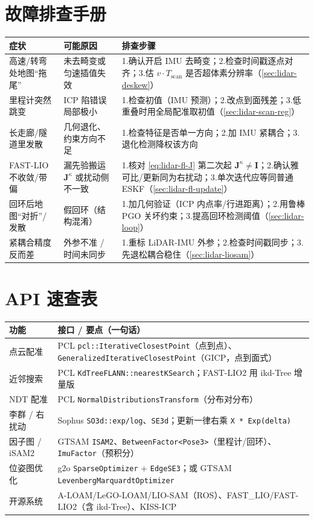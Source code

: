 \section*{故障排查手册}
\begin{table}[H]\centering\small
\begin{tabular}{p{} p{} p{}}
\toprule
症状 & 可能原因 & 排查步骤 \\
\midrule
高速/转弯处地图“拖尾” & 未去畸变或匀速插值失效 & 1.确认开启 IMU 去畸变；2.检查时间戳逐点对齐；3.估 $v\cdot T_{\text{scan}}$ 是否超体素分辨率（\cref{sec:lidar-deskew}）\\
里程计突然跳变 & ICP 陷错误局部极小 & 1.检查初值（IMU 预测）；2.改点到面残差；3.低重叠时用全局配准取初值（\cref{sec:lidar-scan-reg}）\\
长走廊/隧道里发散 & 几何退化、约束方向不足 & 1.检查特征是否单一方向；2.加 IMU 紧耦合；3.退化检测降权该方向 \\
FAST-LIO 不收敛/带偏 & 漏先验搬运 $\mathbf{J}^\kappa$ 或扰动侧不一致 & 1.核对 \cref{eq:lidar-fl-J} 第二次起 $\mathbf{J}^\kappa\neq\mathbf{I}$；2.确认雅可比/更新同为右扰动；3.单次迭代应等同普通 ESKF（\cref{sec:lidar-fl-update}）\\
回环后地图“对折”/发散 & 假回环（结构混淆） & 1.加几何验证（ICP 内点率/行进距离）；2.用鲁棒 PGO 关坏约束；3.提高回环检测阈值（\cref{sec:lidar-loop}）\\
紧耦合精度反而差 & 外参不准 / 时间未同步 & 1.重标 LiDAR-IMU 外参；2.检查时间戳同步；3.先退松耦合稳住（\cref{sec:lidar-liosam}）\\
\bottomrule
\end{tabular}
\end{table}

\section*{API 速查表}
\begin{table}[H]\centering\small
\begin{tabular}{p{} p{}}
\toprule
功能 & 接口 / 要点（一句话） \\
\midrule
点云配准 & PCL \texttt{pcl::IterativeClosestPoint}（点到点）、\texttt{GeneralizedIterativeClosestPoint}（GICP，点到面式） \\
近邻搜索 & PCL \texttt{KdTreeFLANN::nearestKSearch}；FAST-LIO2 用 ikd-Tree 增量版 \\
NDT 配准 & PCL \texttt{NormalDistributionsTransform}（分布对分布） \\
李群 / 右扰动 & Sophus \texttt{SO3d::exp/log}、\texttt{SE3d}；更新一律右乘 \texttt{X * Exp(delta)} \\
因子图 / iSAM2 & GTSAM \texttt{ISAM2}、\texttt{BetweenFactor<Pose3>}（里程计/回环）、\texttt{ImuFactor}（预积分） \\
位姿图优化 & g2o \texttt{SparseOptimizer} + \texttt{EdgeSE3}；或 GTSAM \texttt{LevenbergMarquardtOptimizer} \\
开源系统 & A-LOAM/LeGO-LOAM/LIO-SAM（ROS）、FAST\_LIO/FAST-LIO2（含 ikd-Tree）、KISS-ICP \\
\bottomrule
\end{tabular}
\end{table}

